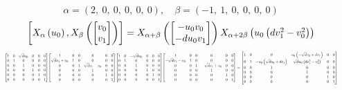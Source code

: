 \documentclass[11pt]{article}
\theoremstyle{definition}
\begin{document}
\[
\alpha = \left( 2, \  0, \  0, \  0, \  0, \  0\right), \quad \beta = \left( -1, \  1, \  0, \  0, \  0, \  0\right)
\]
\[
\scaletoalign{\textwidth}{\left[ X_{\alpha}\left(u_{0}\right), X_{\beta}\left(\left[\begin{matrix}v_{0}\\v_{1}\end{matrix}\right]\right) \right] = X_{\alpha + \beta}\left(\left[\begin{matrix}- u_{0} v_{0}\\- d u_{0} v_{1}\end{matrix}\right]\right) X_{\alpha + 2\beta}\left(u_{0} \left(d v_{1}^{2} - v_{0}^{2}\right)\right)}
\]
\[
\scaletoalign{\textwidth}{{\left[\begin{matrix}1 & 0 & \sqrt{d} u_{0} & 0 & 0 & 0\\0 & 1 & 0 & 0 & 0 & 0\\0 & 0 & 1 & 0 & 0 & 0\\0 & 0 & 0 & 1 & 0 & 0\\0 & 0 & 0 & 0 & 1 & 0\\0 & 0 & 0 & 0 & 0 & 1\end{matrix}\right]} {\left[\begin{matrix}1 & 0 & 0 & 0 & 0 & 0\\\sqrt{d} v_{1} + v_{0} & 1 & 0 & 0 & 0 & 0\\0 & 0 & 1 & \sqrt{d} v_{1} - v_{0} & 0 & 0\\0 & 0 & 0 & 1 & 0 & 0\\0 & 0 & 0 & 0 & 1 & 0\\0 & 0 & 0 & 0 & 0 & 1\end{matrix}\right]} {\left[\begin{matrix}1 & 0 & - \sqrt{d} u_{0} & 0 & 0 & 0\\0 & 1 & 0 & 0 & 0 & 0\\0 & 0 & 1 & 0 & 0 & 0\\0 & 0 & 0 & 1 & 0 & 0\\0 & 0 & 0 & 0 & 1 & 0\\0 & 0 & 0 & 0 & 0 & 1\end{matrix}\right]} {\left[\begin{matrix}1 & 0 & 0 & 0 & 0 & 0\\- \sqrt{d} v_{1} - v_{0} & 1 & 0 & 0 & 0 & 0\\0 & 0 & 1 & - \sqrt{d} v_{1} + v_{0} & 0 & 0\\0 & 0 & 0 & 1 & 0 & 0\\0 & 0 & 0 & 0 & 1 & 0\\0 & 0 & 0 & 0 & 0 & 1\end{matrix}\right]} = {\left[\begin{matrix}1 & 0 & 0 & u_{0} \left(- \sqrt{d} v_{0} + d v_{1}\right) & 0 & 0\\0 & 1 & - u_{0} \left(\sqrt{d} v_{0} + d v_{1}\right) & \sqrt{d} u_{0} \left(d v_{1}^{2} - v_{0}^{2}\right) & 0 & 0\\0 & 0 & 1 & 0 & 0 & 0\\0 & 0 & 0 & 1 & 0 & 0\\0 & 0 & 0 & 0 & 1 & 0\\0 & 0 & 0 & 0 & 0 & 1\end{matrix}\right]}}
\]
\end{document}
